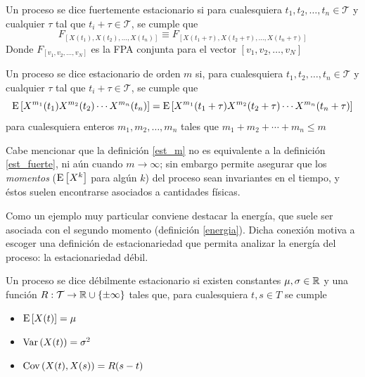 \begin{definicion}
Un proceso \xt se dice fuertemente estacionario si para cualesquiera 
$t_1, t_2, \dots, t_n \in \mathcal{T}$ y cualquier $\tau$ tal que $t_i + \tau \in \mathcal{T}$,
se cumple que
\begin{equation*}
F_{\left[ X(t_1), X(t_2), \dots, X(t_n) \right]} \equiv
F_{\left[ X(t_1 + \tau), X(t_2 + \tau), \dots, X(t_n + \tau) \right]}
\end{equation*}
Donde $F_{[v_1,v_2,\dots,v_N]}$ es la FPA conjunta para el vector $[v_1,v_2,\dots,v_N]$
\label{est_fuerte}
\end{definicion}

\begin{definicion}
Un proceso \xt se dice estacionario de orden $m$ si, para cualesquiera
$t_1, t_2, \dots, t_n \in \mathcal{T}$ y cualquier $\tau$ tal que $t_i + \tau \in \mathcal{T}$,
se cumple que
\begin{equation*}
\mathrm{E}\left[ X^{m_1}(t_1)X^{m_2}(t_2)\cdots X^{m_n}(t_n) \right] =
\mathrm{E}\left[ X^{m_1}(t_1+\tau)X^{m_2}(t_2+\tau)\cdots X^{m_n}(t_n+\tau) \right]
\end{equation*}
para cualesquiera enteros $m_1, m_2, \dots, m_n$ tales que $m_1+m_2+\cdots+m_n \leq m$
\label{est_m}
\end{definicion}

Cabe mencionar que la definición \ref{est_m} no es equivalente a la definición \ref{est_fuerte}, ni
aún cuando $m\rightarrow \infty$; sin embargo permite asegurar que los \textit{momentos} 
($\mathrm{E}\left[ X^{k} \right]$ para algún $k$) del proceso sean invariantes en el tiempo, y éstos suelen encontrarse
asociados a cantidades físicas.

Como un ejemplo muy particular conviene destacar la energía, que suele ser asociada con el segundo
momento (definición \ref{energia}). 
%
Dicha conexión motiva a escoger una definición de estacionariedad que permita analizar la energía 
del proceso: la estacionariedad débil.

\begin{definicion}
Un proceso \xt se dice débilmente estacionario si existen constantes $\mu, \sigma \in \mathbb{R}$ y una 
función $R : \mathcal{T} \rightarrow \mathbb{R} \cup \{ \pm \infty \} $ tales que, para cualesquiera $t, s \in T$ se 
cumple
\begin{itemize}
\item $\mathrm{E}\left[ X(t) \right] = \mu$
\item $\mathrm{Var}\left( X(t) \right) = \sigma^{2}$
\item $\mathrm{Cov}\left( X(t),X(s) \right) = R(s-t)$
\end{itemize}
\end{definicion}

